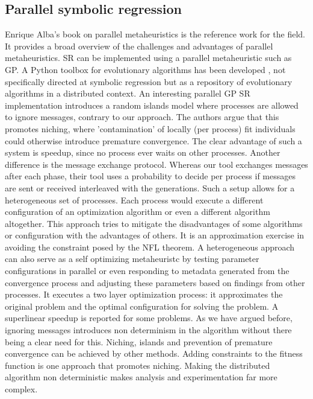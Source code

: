 \subsection{Parallel symbolic regression}
Enrique Alba's book \cite{parallelmetaheuristics} on parallel metaheuristics is the reference work for the field. It provides a broad overview of the challenges and advantages of parallel metaheuristics.  SR can be implemented using a parallel metaheuristic such as GP.
A Python toolbox for evolutionary algorithms has been developed \citep{DEAP}, not specifically directed at symbolic regression but as a repository of evolutionary algorithms in a distributed context.
An interesting parallel GP SR implementation \citep{DGPSR} introduces a random islands model where processes are allowed to ignore messages, contrary to our approach. The authors argue that this promotes niching, where 'contamination' of locally (per process) fit individuals could otherwise introduce premature convergence. The clear advantage of such a system is speedup, since no process ever waits on other processes. Another difference is the message exchange protocol. Whereas our tool exchanges messages after each phase, their tool uses a probability to decide per process if messages are sent or received interleaved with the generations. Such a setup allows for a heterogeneous set of processes.
Each process would execute a different configuration of an optimization algorithm or even a different algorithm altogether.
This approach tries to mitigate the disadvantages of some algorithms or configuration with the advantages of others. It is an approximation exercise in avoiding the constraint posed by the NFL theorem. A heterogeneous approach can also serve as a self optimizing metaheuristc by testing parameter configurations in parallel or even responding to metadata generated from the convergence process and adjusting these parameters based on findings from other processes. It executes a two layer optimization process: it approximates the original problem and the optimal configuration for solving the problem. %
A superlinear speedup is reported for some problems. As we have argued before, ignoring messages introduces non determinism in the algorithm without there being a clear need for this. Niching, islands and prevention of premature convergence can be achieved by other methods. Adding constraints to the fitness function is one approach that promotes niching. Making the distributed algorithm non deterministic makes analysis and experimentation far more complex. 
